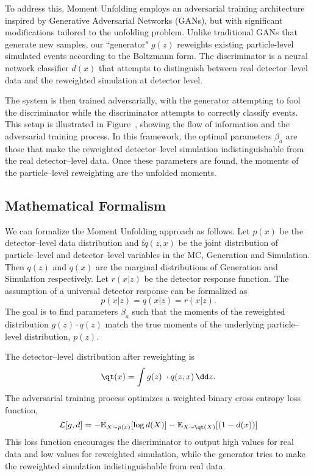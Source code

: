         To address this, Moment Unfolding employs an adversarial training architecture inspired by Generative Adversarial Networks (GANs), but with significant modifications tailored to the unfolding problem.
        Unlike traditional GANs that generate new samples, our ``generator" $g(z)$ reweights existing particle-level simulated events according to the Boltzmann form.
        The discriminator is a neural network classifier $d(x)$ that attempts to distinguish between real detector--level data and the reweighted simulation at detector level.

        The system is then trained adversarially, with the generator attempting to fool the discriminator while the discriminator attempts to correctly classify events.
        This setup is illustrated in Figure~, showing the flow of information and the adversarial training process.
        In this framework, the optimal parameters $\beta_a$ are those that make the reweighted detector--level simulation indistinguishable from the real detector--level data.
        Once these parameters are found, the moments of the particle--level reweighting are the unfolded moments.
    \subsection{Mathematical Formalism}
        We can formalize the Moment Unfolding approach as follows.
        Let $p(x)$ be the detector--level data distribution and f$q(z,x)$ be the joint distribution of particle--level and detector--level variables in the MC, Generation and Simulation.
        Then $q(z)$ and $q(x)$ are the marginal distributions of Generation and Simulation respectively.
        Let $r(x|z)$ be the detector response function.
        The assumption of a universal detector response can be formalized as
        \[
            p(x|z) = q(x|z) = r(x|z).
        \]
        The goal is to find parameters $\beta_a$ such that the moments of the reweighted distribution $g(z) \cdot q(z)$ match the true moments of the underlying particle--level distribution, \(p(z)\).

        The detector--level distribution after reweighting is
        \[
            \qt(x) = \int g(z)\; \cdot q(z, x) \, \dd z.
        \]
        The adversarial training process optimizes a weighted binary cross entropy loss function,
        \[
            \mathcal{L}[g,d] = -\mathbb{E}_{X \sim p(x)}[\log d(X)] - \mathbb{E}_{X \sim\qt(X) }[(1-d(x))]
        \]
        This loss function encourages the discriminator to output high values for real data and low values for reweighted simulation, while the generator tries to make the reweighted simulation indistinguishable from real data.

